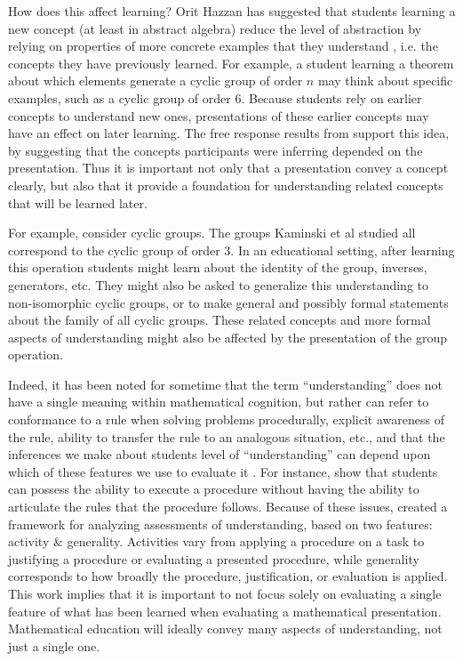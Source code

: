 \documentclass[man,10pt]{apa6}
\begin{document}
How does this affect learning? Orit Hazzan has suggested that students learning a new concept (at least in abstract algebra) reduce the level of abstraction by relying on properties of more concrete examples that they understand \cite{Hazzan1999}, i.e. the concepts they have previously learned. For example, a student learning a theorem about which elements generate a cyclic group of order $n$ may think about specific examples, such as a cyclic group of order 6. Because students rely on earlier concepts to understand new ones, presentations of these earlier concepts may have an effect on later learning. The free response results from  support this idea, by suggesting that the concepts participants were inferring depended on the presentation. Thus it is important not only that a presentation convey a concept clearly, but also that it provide a foundation for understanding related concepts that will be learned later. \par
For example, consider cyclic groups. The groups Kaminski et al studied all correspond to the cyclic group of order 3. In an educational setting, after learning this operation students might learn about the identity of the group, inverses, generators, etc. They might also be asked to generalize this understanding to non-isomorphic cyclic groups, or to make general and possibly formal statements about the family of all cyclic groups. These related concepts and more formal aspects of understanding might also be affected by the presentation of the group operation. \par
Indeed, it has been noted for sometime that the term ``understanding'' does not have a single meaning within mathematical cognition, but rather can refer to conformance to a rule when solving problems procedurally, explicit awareness of the rule, ability to transfer the rule to an analogous situation, etc., and that the inferences we make about students level of ``understanding'' can depend upon which of these features we use to evaluate it \cite{Greeno1987,Bisanz1992}. For instance,  show that students can possess the ability to execute a procedure without having the ability to articulate the rules that the procedure follows. Because of these issues,  created a framework for analyzing assessments of understanding, based on two features: activity \& generality. Activities vary from applying a procedure on a task to justifying a procedure or evaluating a presented procedure, while generality corresponds to how broadly the procedure, justification, or evaluation is applied. This work implies that it is important to not focus solely on evaluating a single feature of what has been learned when evaluating a mathematical presentation. Mathematical education will ideally convey many aspects of understanding, not just a single one. \par
\end{document}

